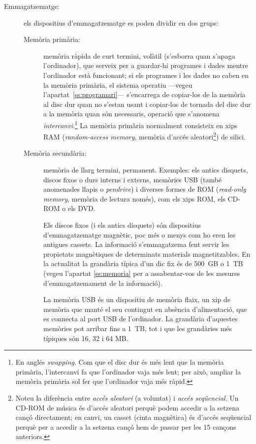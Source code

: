 \begin{description}
\item[Emmagatzematge:] els dispositius d'emmagatzematge es poden
  dividir en dos grups:
  \begin{description}
  \item[Memòria primària:] memòria ràpida de curt termini, volàtil
    (s'esborra quan s'apaga l'ordinador), que serveix per a guardar-hi
    programes i dades mentre l'ordinador està funcionant; si els
    programes i les dades no caben en la memòria primària, el sistema
    operatiu ---vegeu l'apartat~\ref{ss:programari}--- s'encarrega de
    copiar-los de la memòria al disc dur quan no s'estan usant i
    copiar-los de tornada del disc dur a la memòria quan són
    necessaris, operació que s'anomena \emph{intercanvi}.\footnote{En
      anglés \emph{swapping}. Com que el disc dur és més lent que la
      memòria primària, l'intercanvi fa que l'ordinador vaja més lent;
      per això, ampliar la memòria primària sol fer que l'ordinador
      vaja més ràpid.} La memòria primària normalment consisteix en
    xips RAM (\emph{random-access memory}, memòria d'accés
    aleatori\footnote{Noteu la diferència entre \emph{accés aleatori}
      (a voluntat) i \emph{accés seqüencial}. Un CD-ROM de música és
      d'accés aleatori perquè podem accedir a la setzena cançó
      directament; en canvi, un casset (cinta magnètica) és d'accés
      seqüencial perquè per a accedir a la setzena cançó hem de passar
      per les 15 cançons anteriors.}) de silici.
    
  \item[Memòria secundària:] memòria de llarg termini, permanent.
    Exemples: els antics disquets, discos fixos o durs interns i
    externs, memòries USB (també anomenades llapis o \emph{pendrive})
    i diverses formes de ROM (\emph{read-only memory}, memòria de
    lectura només), com els xips ROM, els CD-ROM o els DVD.  

    Els discos fixos (i els antics disquets) són dispositius
    d'emmagatzematge magnètic, poc més o menys com ho eren les
    antigues cassets. La informació s'emmagatzema fent servir les
    propietats magnètiques de determinats materials magnetitzables. En
    la actualitat la grandària típica d'un dic fix és de 500~GB o 1~TB
    (vegeu l'apartat \ref{ss:memoria} per a assabentar-vos de les
    mesures d'emmagatzemament de la informació).

    La memòria USB és un dispositiu de memòria flaix, un xip de
    memòria que manté el seu contingut en absència d'alimentació, que
    es connecta al port USB de l'ordinador. La grandària d'aquestes
    memòries pot arribar fins a 1~TB, tot i que les grandàries més
    típiques són 16, 32 i 64 MB.


\end{description}
\end{description}
